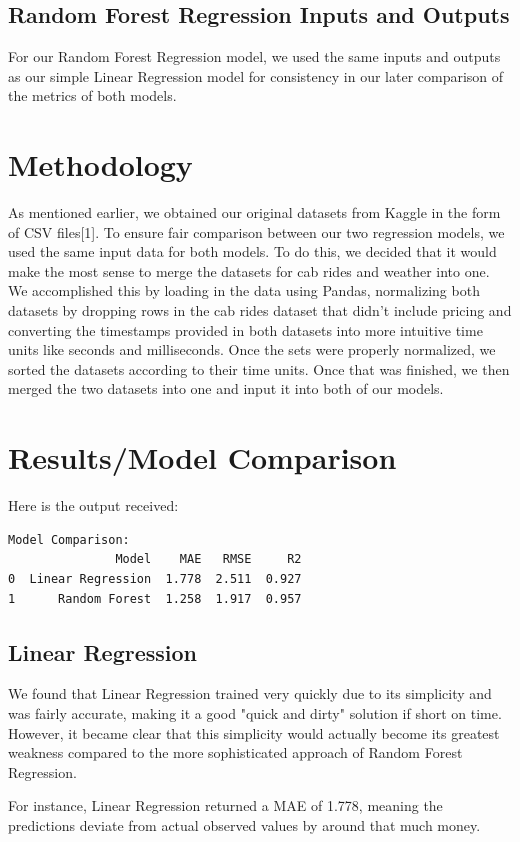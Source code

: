 \documentclass[conference]{IEEEtran}
\begin{document}
\subsection{Random Forest Regression Inputs and Outputs}
For our Random Forest Regression model, we used the same inputs and outputs as our simple Linear Regression model for consistency in our later comparison of the metrics of both models.

\section{Methodology}
As mentioned earlier, we obtained our original datasets from Kaggle in the form of CSV files[1]. To ensure fair comparison between our two regression models, we used the same input data for both models. To do this, we decided that it would make the most sense to merge the datasets for cab rides and weather into one. We accomplished this by loading in the data using Pandas, normalizing both datasets by dropping rows in the cab rides dataset that didn't include pricing and converting the timestamps provided in both datasets into more intuitive time units like seconds and milliseconds. Once the sets were properly normalized, we sorted the datasets according to their time units. Once that was finished, we then merged the two datasets into one and input it into both of our models.

\section{Results/Model Comparison}
Here is the output received:
\begin{center}
\begin{verbatim}
Model Comparison:
               Model    MAE   RMSE     R2
0  Linear Regression  1.778  2.511  0.927
1      Random Forest  1.258  1.917  0.957
\end{verbatim}
\end{center}
\subsection{Linear Regression}
We found that Linear Regression trained very quickly due to its simplicity and was fairly accurate, making it a good "quick and dirty" solution if short on time. However, it became clear that this simplicity would actually become its greatest weakness compared to the more sophisticated approach of Random Forest Regression.

For instance, Linear Regression returned a MAE of 1.778, meaning the predictions deviate from actual observed values by around that much money.
\end{document}
